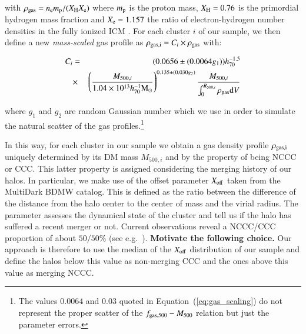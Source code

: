 \documentclass[traditabstract]{aa}
\newcommand{\rmn}{\mathrm}
\begin{document}
with $\rho_{\rm{gas}} = n_{\rm{e}} m_{\rm{p}} / ( X_{\rm{H}}X_{\rm{e}} )$ where $m_{\rm{p}}$ is the proton mass, $X_{\rm{H}} = 0.76$ is the primordial hydrogen mass fraction and $X_{\rm{e}} = 1.157$ the ratio of electron-hydrogen number densities in the fully ionized ICM \citep{1988xrec.book.....S}. For each cluster $i$ of our sample, we then define a new \emph{mass-scaled} gas profile as $\rho_{\rm{gas},i}=C_{i} \times \rho_{\rm{gas}}$ with:

\begin{eqnarray}
C_{i}  & = &  (0.0656\pm(0.0064g_{1}))  h_{70}^{-1.5}  \nonumber \\
 & \times & \left(\frac{M_{500,i}}{1.04 \times 10^{13} h_{70}^{-1} \rmn{M_{\odot}}}\right)^{0.135\pm(0.030g_{2})} \frac{M_{500,i}}{\int_{0}^{R_{500,i}} \rho_{\rm{gas}} \rmn{d}V}
\label{eq:gas_scaling}
\end{eqnarray}
 
where $g_{1}$ and $g_{2}$ are random Gaussian number which we use in order to simulate the natural scatter of the gas profiles.\footnote[4]{The values $0.0064$ and $0.03$ quoted in Equation~(\ref{eq:gas_scaling}) do not represent the proper scatter of the $f_{\rm{gas},500}-M_{500}$ relation but just the parameter errors.} 

In this way, for each cluster in our sample we obtain a gas density profile $\rho_{\rm{gas},i}$ uniquely determined by its DM mass $M_{500,i}$ and by the property of being NCCC or CCC. This latter property is assigned considering the merging history of our halos. In particular, we make use of the offset parameter $X_{\rm{off}}$ taken from the MultiDark BDMW catalog. This is defined as the ratio between the difference of the distance from the halo center to the center of mass and the virial radius. The parameter assesses the dynamical state of the cluster and tell us if the halo has suffered a recent merger or not. Current observations reveal a NCCC/CCC proportion of about $50/50\%$ (see e.g.~\citealp{2007A&A...466..805C,2009MNRAS.395..764S}).  {\bf Motivate the following choice.} Our approach is therefore to use the median of the $X_{\rm{off}}$ distribution of our sample and define the halos below this value as non-merging CCC and the ones above this value as merging NCCC.
\end{document}
